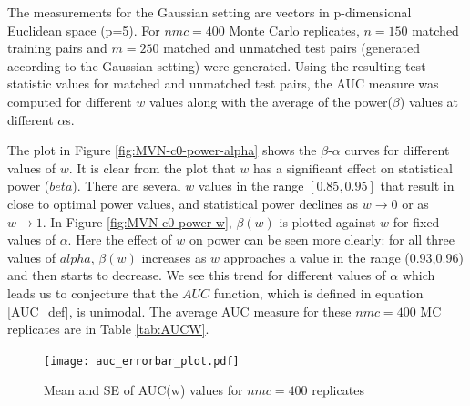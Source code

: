 \documentclass[12pt]{article} %
\begin{document}

	


 The measurements for the Gaussian setting are vectors in p-dimensional Euclidean space (p=5). For $nmc=400$ Monte Carlo replicates,  $n=150$ matched training pairs and $m=250$ matched and unmatched test pairs (generated according to the Gaussian setting) were generated. Using the resulting test statistic values for matched and unmatched test pairs, the AUC measure was computed for different $w$ values along with the average of the power($\beta$) values at  different $\alpha$s.

 The plot in Figure \ref{fig:MVN-c0-power-alpha} shows the  $\beta$-$\alpha$ curves for different values of  $w$. It is clear from the plot that $w$ has a significant effect on statistical power ($beta$). There are several $w$ values in the range $[0.85,0.95]$ that result in close to optimal power values, and statistical power declines as $w \rightarrow 0$ or as $w \rightarrow 1$.  In Figure
 \ref{fig:MVN-c0-power-w},  $\beta(w)$ is plotted against $w$ for fixed values of $\alpha$.  Here the effect of $w$ on power can be seen more clearly: for all  three values of $alpha$, $\beta(w)$ increases as $w$ approaches a value in the range (0.93,0.96) and then starts to decrease. We see this trend for different values of $\alpha$ which leads us to conjecture that the $AUC$ function, which is defined in equation \eqref{AUC_def}, is unimodal.
The average AUC measure for these $nmc=400$ MC replicates are  in  Table \ref{tab:AUCW}.

\begin{figure}[h]
	\centering
	
		\texttt{[image: auc\_errorbar\_plot.pdf]}
	
	\caption{Mean and SE of AUC(w) values for $nmc=400$ replicates}
	\label{fig:ArgMaxWAUCW}
\end{figure}
\end{document}
